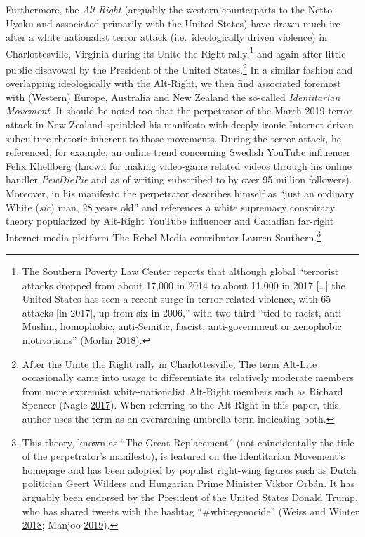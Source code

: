 \documentclass[10pt,british,A4paper,twoside]{memoir}
\begin{document}
Furthermore, the \emph{Alt-Right} (arguably the western counterparts to
the Netto-Uyoku and associated primarily with the United States) have
drawn much ire after a white nationalist terror attack
(i.e.~ideologically driven violence) in Charlottesville, Virginia during
its Unite the Right rally,\footnote{The Southern Poverty Law Center
  reports that although global ``terrorist attacks dropped from about
  17,000 in 2014 to about 11,000 in 2017 {[}\ldots{}{]} the United
  States has seen a recent surge in terror-related violence, with 65
  attacks {[}in 2017{]}, up from six in 2006,'' with two-third ``tied to
  racist, anti-Muslim, homophobic, anti-Semitic, fascist,
  anti-government or xenophobic motivations'' (Morlin
  \protect\hyperlink{ref-morlin_study_2018}{2018}).} and again after
little public disavowal by the President of the United States.\footnote{After
  the Unite the Right rally in Charlottesville, The term Alt-Lite
  occasionally came into usage to differentiate its relatively moderate
  members from more extremist white-nationalist Alt-Right members such
  as Richard Spencer (Nagle
  \protect\hyperlink{ref-nagle_kill_2017}{2017}). When referring to the
  Alt-Right in this paper, this author uses the term as an overarching
  umbrella term indicating both.} In a similar fashion and overlapping
ideologically with the Alt-Right, we then find associated foremost with
(Western) Europe, Australia and New Zealand the so-called
\emph{Identitarian Movement}. It should be noted too that the
perpetrator of the March 2019 terror attack in New Zealand sprinkled his
manifesto with deeply ironic Internet-driven subculture rhetoric
inherent to those movements. During the terror attack, he referenced, for example, an
online trend concerning Swedish YouTube influencer Felix Khellberg
(known for making video-game related videos through his online handler
\emph{PewDiePie} and as of writing subscribed to by over 95 million
followers). Moreover, in his manifesto the perpetrator describes himself
as ``just an ordinary White (\emph{sic}) man, 28 years old'' and
references a white supremacy conspiracy theory popularized by Alt-Right
YouTube influencer and Canadian far-right Internet media-platform The
Rebel Media contributor Lauren Southern.\footnote{This theory, known as
  ``The Great Replacement'' (not coincidentally the title of the
  perpetrator's manifesto), is featured on the Identitarian Movement's
  homepage and has been adopted by populist right-wing figures such as
  Dutch politician Geert Wilders and Hungarian Prime Minister Viktor
  Orbán. It has arguably been endorsed by the President of the United
  States Donald Trump, who has shared tweets with the hashtag
  ``\#whitegenocide'' (Weiss and Winter
  \protect\hyperlink{ref-weiss_opinion_2018}{2018}; Manjoo
  \protect\hyperlink{ref-manjoo_opinion_2019}{2019}).}
\end{document}
